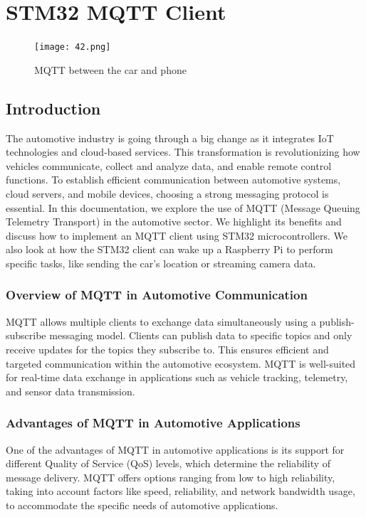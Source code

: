 \documentclass[
12pt,
oneside, 
onehalfspacing, 
nolistspacing, 
parskip, 
chapterinoneline, 
]{AASTCOMPUTER}
\begin{document}
\chapter{STM32 MQTT Client}
\begin{figure}[!ht]
\centering
\texttt{[image: 42.png]}
\caption[MQTT between the car and phone]{MQTT between the car and phone}
\label{fig:TCU}
\end{figure}
\section{Introduction}
The automotive industry is going through a big change as it integrates IoT technologies and cloud-based services. This transformation is revolutionizing how vehicles communicate, collect and analyze data, and enable remote control functions. To establish efficient communication between automotive systems, cloud servers, and mobile devices, choosing a strong messaging protocol is essential. In this documentation, we explore the use of MQTT \cite{yokotani2016comparison} (Message Queuing Telemetry Transport) in the automotive sector. We highlight its benefits and discuss how to implement an MQTT client using STM32 microcontrollers. We also look at how the STM32 client can wake up a Raspberry Pi to perform specific tasks, like sending the car's location or streaming camera data.

\subsection{Overview of MQTT in Automotive Communication}
MQTT allows multiple clients to exchange data simultaneously using a publish-subscribe messaging model. Clients can publish data to specific topics and only receive updates for the topics they subscribe to. This ensures efficient and targeted communication within the automotive ecosystem. MQTT is well-suited for real-time data exchange in applications such as vehicle tracking, telemetry, and sensor data transmission.

\subsection{Advantages of MQTT in Automotive Applications}
One of the advantages of MQTT in automotive applications is its support for different Quality of Service (QoS) levels, which determine the reliability of message delivery. MQTT offers options ranging from low to high reliability, taking into account factors like speed, reliability, and network bandwidth usage, to accommodate the specific needs of automotive applications.
\end{document}
